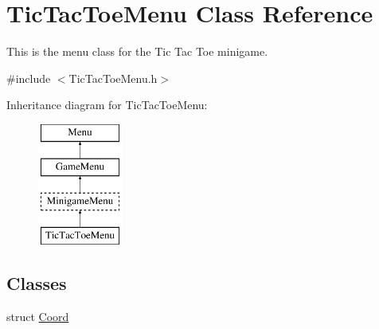 \hypertarget{classTicTacToeMenu}{\section{Tic\-Tac\-Toe\-Menu Class Reference}
\label{classTicTacToeMenu}
}


This is the menu class for the Tic Tac Toe minigame.  




{\ttfamily \#include $<$Tic\-Tac\-Toe\-Menu.\-h$>$}

Inheritance diagram for Tic\-Tac\-Toe\-Menu\-:\begin{figure}[H]
\begin{center}
\leavevmode
\includegraphics[height=4.000000cm]{classTicTacToeMenu}
\end{center}
\end{figure}
\subsection*{Classes}
\begin{DoxyCompactItemize}
\item 
struct \hyperlink{structTicTacToeMenu_1_1Coord}{Coord}
\end{DoxyCompactItemize}
